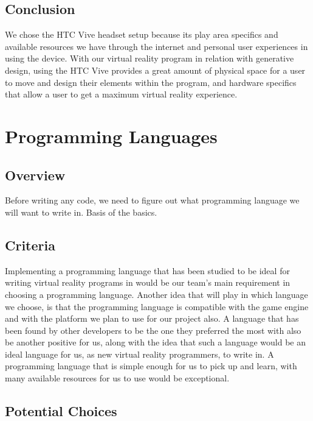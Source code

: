 \documentclass[letterpaper,10pt,onecolumn,compsoc]{IEEEtran}
\begin{document}
\subsection{Conclusion}

\noindent
We chose the HTC Vive headset setup because its play area specifics and available resources we have through the internet and personal user experiences in using the device. With our virtual reality program in relation with generative design, using the HTC Vive provides a great amount of physical space for a user to move and design their elements within the program, and hardware specifics that allow a user to get a maximum virtual reality experience.

\section{Programming Languages}
\subsection{Overview}

\noindent
Before writing any code, we need to figure out what programming language we will want to write in. Basis of the basics.

\subsection{Criteria}

\noindent
Implementing a programming language that has been studied to be ideal for writing virtual reality programs in would be our team's main requirement in choosing a programming language. Another idea that will play in which language we choose, is that the programming language is compatible with the game engine and with the platform we plan to use for our project also. A language that has been found by other developers to be the one they preferred the most with also be another positive for us, along with the idea that such a language would be an ideal language for us, as new virtual reality programmers, to write in. A programming language that is simple enough for us to pick up and learn, with many available resources for us to use would be exceptional.

\subsection{Potential Choices}
\end{document}
